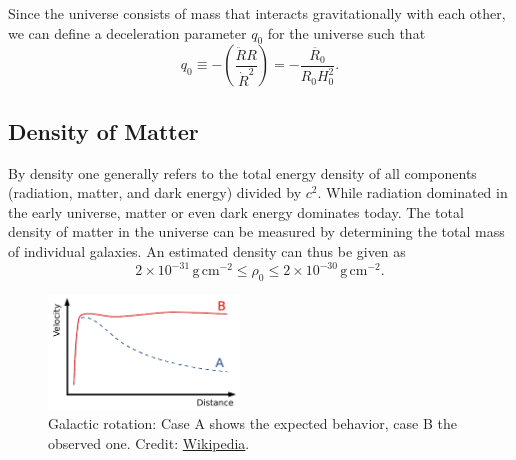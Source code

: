 Since the universe consists of mass that interacts gravitationally with each other, we can define a deceleration parameter $q_0$ for the universe such that
\begin{equation}
    \label{eqn:bbn:decceleration}
    q_0 \equiv -\left(\frac{\ddot{R} R}{\dot{R}^2}\right) = - \frac{\ddot{R_0}}{R_0 H_0^2}.
\end{equation}


\subsection{Density of Matter}
By density one generally refers to the total energy density of all components (radiation, matter, and dark energy) divided by $c^2$. While radiation dominated in the early universe, matter or even dark energy dominates today. The total density of matter in the universe can be measured by determining the total mass of individual galaxies. An estimated density can thus be given as
\begin{equation}
    2 \times 10^{-31}\,\mathrm{g}\,\mathrm{cm}^{-2} \leq \rho_0 \leq 2\times10^{-30}\,\mathrm{g}\,\mathrm{cm}^{-2}.
\end{equation}

\begin{figure}[tb]
    \centering
    \includegraphics[width=0.45\textwidth]{graphics/bbn/galactic_rotation}
    \caption{Galactic rotation: Case A shows the expected behavior, case B the observed one. Credit: \href{https://en.wikipedia.org/wiki/Dark_matter}{Wikipedia}.}
    \label{fig:bbn:galactic_rotation}
\end{figure}



